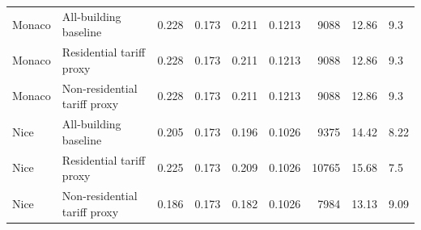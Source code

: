 {\begin{longtable}{llrrrrrrl}
\midrule
Monaco & All-building baseline & 0.228 & 0.173 & 0.211 & 0.1213 & 9088 & 12.86 & 9.3 \\
Monaco & Residential tariff proxy & 0.228 & 0.173 & 0.211 & 0.1213 & 9088 & 12.86 & 9.3 \\
Monaco & Non-residential tariff proxy & 0.228 & 0.173 & 0.211 & 0.1213 & 9088 & 12.86 & 9.3 \\
\midrule
Nice & All-building baseline & 0.205 & 0.173 & 0.196 & 0.1026 & 9375 & 14.42 & 8.22 \\
Nice & Residential tariff proxy & 0.225 & 0.173 & 0.209 & 0.1026 & 10765 & 15.68 & 7.5 \\
Nice & Non-residential tariff proxy & 0.186 & 0.173 & 0.182 & 0.1026 & 7984 & 13.13 & 9.09 \\
\bottomrule
\end{longtable}
}
